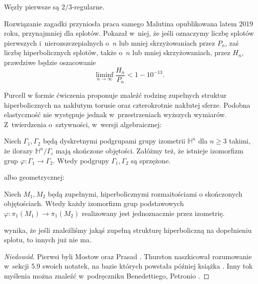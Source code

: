 \begin{conjecture}
    \label{con:malyutin4}
    Węzły pierwsze są $2/3$-regularne.
\end{conjecture}

Rozwiązanie zagadki przyniosła praca samego Malutina \cite{malyutin2019} opublikowana latem 2019 roku, przynajmniej dla splotów.
%
Pokazał w~niej, że jeśli oznaczymy liczbę splotów pierwszych i~nierozszczepialnych o~$n$ lub mniej skrzyżowaniach przez $P_n$, zaś liczbę hiperbolicznych splotów, także o~$n$ lub mniej skrzyżowaniach, przez $H_n$, prawdziwe będzie oszacowanie
\begin{equation}
    \liminf_{n \to \infty} \frac{H_n}{P_n} < 1 - 10^{-13}.
\end{equation}

Purcell \cite[s. 66]{purcell2020} w formie ćwiczenia proponuje znaleźć rodzinę zupełnych struktur hiperbolicznych na nakłutym torusie oraz czterokrotnie nakłutej sferze.
Podobna elastyczność nie występuje jednak w~przestrzeniach wyższych wymiarów.
Z~twierdzenia o~sztywności, w~wersji algebraicznej:

\begin{theorem}
    Niech $\Gamma_1, \Gamma_2$ będą dyskretnymi podgrupami grupy izometrii $\mathbb H^n$ dla $n \ge 3$ takimi, że ilorazy $\mathbb H^n/\Gamma_i$ mają skończone objętości.
    Załóżmy też, że istnieje izomorfizm grup $\varphi \colon \Gamma_1 \to \Gamma_2$.
    Wtedy podgrupy $\Gamma_1, \Gamma_2$ są sprzężone.
\end{theorem}

albo geometrycznej:

\begin{theorem}
    Niech $M_1, M_2$ będą zupełnymi, hiperbolicznymi rozmaitościami o skończonych objętościach.
    Wtedy każdy izomorfizm grup podstawowych $\varphi \colon \pi_1(M_1) \to \pi_1(M_2)$ realizowany jest jednoznacznie przez izometrię.
\end{theorem}

wynika, że jeśli znaleźliśmy jakąś zupełną strukturę hiperboliczną na dopełnieniu splotu, to innych już nie ma.

\begin{proof}[Niedowód]
%
%
%
%
%
Pierwsi byli Mostow \cite{mostow1973} oraz Prasad \cite{prasad1973}.
    Thurston naszkicował rozumowanie w~sekcji 5.9 swoich notatek, na bazie których powstała później książka \cite{thurston1997}.
    Inny tok myślenia można znaleźć w~podręczniku Benedettiego, Petronio \cite[rozdział C]{benedetti1992}.
\end{proof}

